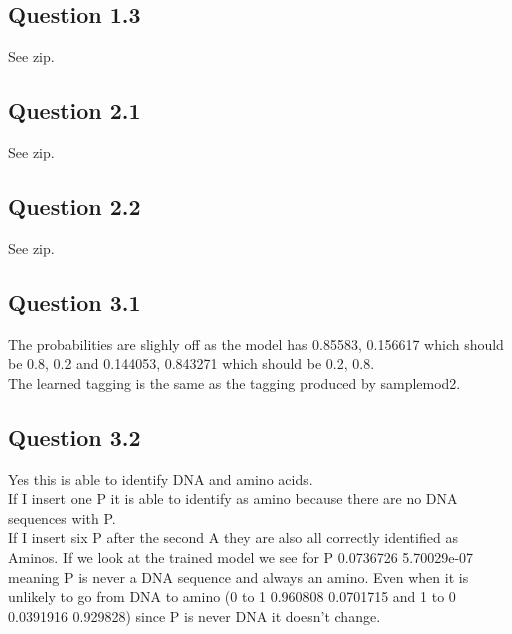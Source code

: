 \documentclass[11pt]{article}
\begin{document}
\subsection{Question 1.3}
See zip.
\subsection{Question 2.1}
See zip.
\subsection{Question 2.2}
See zip.
\subsection{Question 3.1}
The probabilities are slighly off as the model has 0.85583, 0.156617 which should be 0.8, 0.2 and 0.144053, 0.843271 which should be 0.2, 0.8. \\
The learned tagging is the same as the tagging produced by samplemod2.
\subsection{Question 3.2}
Yes this is able to identify DNA and amino acids. \\
If I insert one P it is able to identify as amino because there are no DNA sequences with P.\\
If I insert six P after the second A they are also all correctly identified as Aminos. If we look at the trained model we see for P 0.0736726 5.70029e-07 meaning P is never a DNA sequence and always an amino. Even when it is unlikely to go from DNA to amino (0 to 1 0.960808 0.0701715 and 1 to 0 0.0391916 0.929828) since P is never DNA it doesn't change.  
\end{document}
